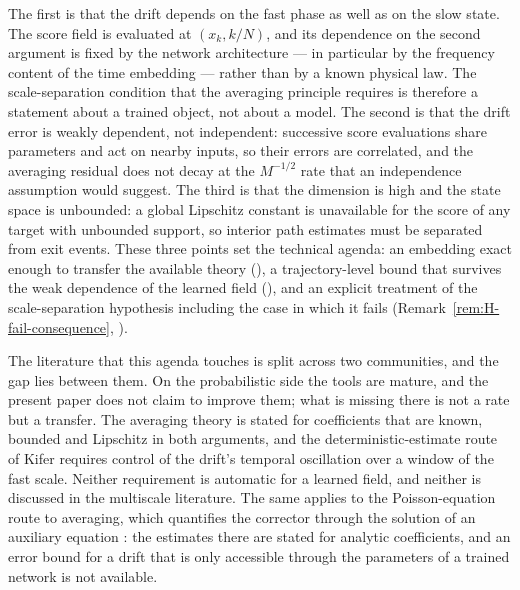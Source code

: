 \documentclass[a4paper,fleqn]{cas-dc}
\theoremstyle{definition}
\begin{document}
The first is that the drift depends on the fast phase as well as on the slow state.
The score field is evaluated at $(x_{k},k/N)$, and its dependence on the second
argument is fixed by the network architecture --- in particular by the frequency
content of the time embedding --- rather than by a known physical law. The
scale-separation condition that the averaging principle requires is therefore a
statement about a trained object, not about a model. The second is that the drift
error is weakly dependent, not independent: successive score evaluations share
parameters and act on nearby inputs, so their errors are correlated, and the averaging
residual does not decay at the $M^{-1/2}$ rate that an independence assumption would
suggest. The third is that the dimension is high and the state space is unbounded: a
global Lipschitz constant is unavailable for the score of any target with unbounded
support, so interior path estimates must be separated from exit events. These three
points set the technical agenda: an embedding exact enough to transfer the available
theory (), a trajectory-level bound that survives the weak
dependence of the learned field (), and an explicit treatment of the
scale-separation hypothesis including the case in which it fails
(Remark~\ref{rem:H-fail-consequence}, ).

The literature that this agenda touches is split across two communities, and the gap
lies between them. On the probabilistic side the tools are mature, and the present
paper does not claim to improve them; what is missing there is not a rate but a
transfer. The averaging theory is stated for coefficients that are known, bounded and
Lipschitz in both arguments, and the deterministic-estimate route of Kifer
\cite{kifer2025} requires control of the drift's temporal oscillation over a window of
the fast scale. Neither requirement is automatic for a learned field, and neither is
discussed in the multiscale literature. The same applies to the Poisson-equation route
to averaging, which quantifies the corrector through the solution of an auxiliary
equation \citep{pardoux2001}: the estimates there are stated for analytic
coefficients, and an error bound for a drift that is only accessible through the
parameters of a trained network is not available.
\end{document}
